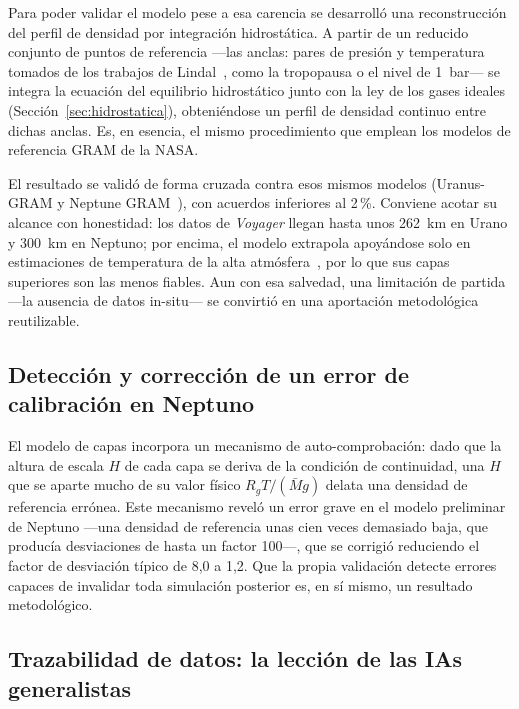 Para poder validar el modelo pese a esa carencia se desarrolló una reconstrucción del perfil de densidad por integración hidrostática. A partir de un reducido conjunto de puntos de referencia ---las anclas: pares de presión y temperatura tomados de los trabajos de Lindal~\cite{lindal1987,lindal1990,lindal1992}, como la tropopausa o el nivel de 1~bar--- se integra la ecuación del equilibrio hidrostático junto con la ley de los gases ideales (Sección~\ref{sec:hidrostatica}), obteniéndose un perfil de densidad continuo entre dichas anclas. Es, en esencia, el mismo procedimiento que emplean los modelos de referencia \gls{GRAM} de la \gls{NASA}.

El resultado se validó de forma cruzada contra esos mismos modelos (Uranus-\gls{GRAM} y Neptune \gls{GRAM}~\cite{uranusGRAM2021,neptuneGRAM2020}), con acuerdos inferiores al 2\,\%. Conviene acotar su alcance con honestidad: los datos de \textit{Voyager} llegan hasta unos 262~km en Urano y 300~km en Neptuno; por encima, el modelo extrapola apoyándose solo en  estimaciones de temperatura de la alta atmósfera~\cite{herbert1987,broadfoot1989}, por lo que sus capas superiores son las menos fiables. Aun con esa salvedad, una limitación de partida ---la ausencia de datos in-situ--- se convirtió en una aportación metodológica reutilizable.

\subsection{Detección y corrección de un error de calibración en Neptuno}

El modelo de capas incorpora un mecanismo de auto-comprobación: dado que la altura de escala $H$ de cada capa se deriva de la condición de continuidad, una $H$ que se aparte mucho de su valor físico $R_g T/(\bar{M} g)$ delata una densidad de referencia errónea. Este mecanismo reveló un error grave en el modelo preliminar de Neptuno ---una densidad de referencia unas cien veces demasiado baja, que producía desviaciones de hasta un factor 100---, que se corrigió reduciendo el factor de desviación típico de 8,0 a 1,2. Que la propia validación detecte errores capaces de invalidar toda simulación posterior es, en sí mismo, un resultado metodológico.

\subsection{Trazabilidad de datos: la lección de las IAs generalistas}


